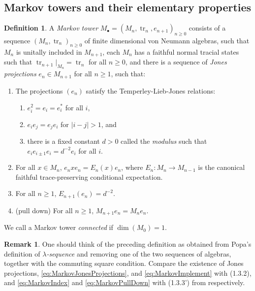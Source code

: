 \documentclass[11pt]{article}
\theoremstyle{plain}
\theoremstyle{definition}
\newtheorem{defn}[thm]{Definition}
\newtheorem{rem}[thm]{Remark}
\DeclareMathOperator{\tr}{tr}
\begin{document}
\subsection{Markov towers and their elementary properties}
\label{sec:MarkovTowersAndElementaryProperties}
\begin{defn}
A \emph{Markov tower} $M_\bullet = (M_n, \tr_n, e_{n+1})_{n\geq 0}$ consists of a sequence $(M_n, \tr_n)_{n\geq 0}$ of finite dimensional von Neumann algebras, such that $M_n$ is unitally included in $M_{n+1}$, each $M_n$ has a faithful normal tracial states such that $\tr_{n+1}|_{M_n} = \tr_n$ for all $n\geq 0$, and there is a sequence of \emph{Jones projections} $e_n \in M_{n+1}$ for all $n\geq 1$, such that:
\begin{enumerate}[label={\rm(M\arabic*)}]
\item
\label{eq:MarkovJonesProjections}
The projections $(e_n)$ satisfy the Temperley-Lieb-Jones relations:
\begin{enumerate}[label={\rm(TLJ\arabic*)}]
\item
$e_i^2 = e_i = e_i^*$ for all $i$,
\item
$e_i e_j = e_j e_i$ for $|i-j|>1$, and
\item
there is a fixed constant $d>0$ called the \emph{modulus} such that $e_{i} e_{i\pm 1} e_i = d^{-2} e_i$ for all $i$.
\end{enumerate}
\item
\label{eq:MarkovImplement}
For all $x\in M_n$, $e_n x e_n = E_n(x)e_n$, where $E_n: M_n \to M_{n-1}$ is the canonical faithful trace-preserving conditional expectation.
\item
\label{eq:MarkovIndex}
For all $n\geq 1$, $E_{n+1}(e_n) = d^{-2}$.
\item
\label{eq:MarkovPullDown}
(pull down)
For all $n\geq 1$, $M_{n+1}e_n = M_n e_n$.
\end{enumerate}
We call a Markov tower \emph{connected} if $\dim(M_0) = 1$.
\end{defn}

\begin{rem}
One should think of the preceding definition as obtained from Popa's definition of \emph{$\lambda$-sequence} \cite{MR1334479} and removing one of the two sequences of algebras, together with the commuting square condition.
Compare the existence of Jones projections, \ref{eq:MarkovJonesProjections}, and \ref{eq:MarkovImplement} with (1.3.2), and \ref{eq:MarkovIndex} and \ref{eq:MarkovPullDown} with (1.3.3') from \cite{MR1334479} respectively.
\end{rem}
\end{document}
